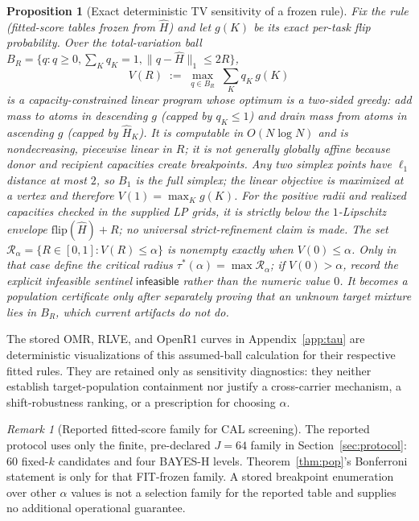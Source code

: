 \documentclass{article}
\newtheorem{proposition}{Proposition}
\theoremstyle{definition}
\theoremstyle{remark}
\newtheorem{remark}{Remark}
\newcommand{\flip}{\mathrm{flip}}
\begin{document}
\begin{proposition}[Exact deterministic TV sensitivity of a frozen rule]
\label{prop:tv}
Fix the rule (fitted-score tables frozen from $\widehat H$) and let $g(K)$ be
its exact per-task flip probability. Over the total-variation ball
$B_R=\{q:q\ge0,\sum_K q_K=1,\|q-\widehat H\|_1\le 2R\}$,
\[
V(R)\;:=\;\max_{q\in B_R}\;\textstyle\sum_K q_K\,g(K)
\]
is a capacity-constrained linear program whose optimum is a two-sided greedy:
add mass to atoms in descending $g$ (capped by $q_K\le1$) and drain mass from
atoms in ascending $g$ (capped by $\widehat H_K$). It is computable in
$O(N\log N)$ and is nondecreasing, piecewise linear in $R$; it is not
generally globally affine because donor and recipient capacities create
breakpoints. Any two simplex points have $\ell_1$ distance at most $2$, so
$B_1$ is the full simplex; the linear objective is maximized at a vertex and
therefore $V(1)=\max_K g(K)$. For the positive radii and realized capacities checked in the
supplied LP grids, it is strictly below the $1$-Lipschitz envelope
$\flip(\widehat H)+R$; no universal strict-refinement claim is made. The
set $\mathcal R_\alpha=\{R\in[0,1]:V(R)\le\alpha\}$ is nonempty exactly
when $V(0)\le\alpha$. Only in that case define the \emph{critical radius}
$\tau^*(\alpha)=\max\mathcal R_\alpha$; if $V(0)>\alpha$, record the
explicit infeasible sentinel $\mathsf{infeasible}$ rather than the numeric
value $0$. It becomes a population certificate only after separately proving
that an unknown target mixture lies in $B_R$, which current artifacts do not
do.
\end{proposition}
The stored OMR, RLVE, and OpenR1 curves in Appendix~\ref{app:tau} are
deterministic visualizations of this assumed-ball calculation for their
respective fitted rules. They are retained only as sensitivity diagnostics:
they neither establish target-population containment nor justify a
cross-carrier mechanism, a shift-robustness ranking, or a prescription for
choosing $\alpha$.

\begin{remark}[Reported fitted-score family for CAL screening]
\label{rem:nested}
The reported protocol uses only the finite, pre-declared $J=64$ family in
Section~\ref{sec:protocol}: 60 fixed-$k$ candidates and four BAYES-H levels.
Theorem~\ref{thm:pop}'s Bonferroni statement is only for that FIT-frozen
family. A stored breakpoint enumeration over other $\alpha$ values is not a
selection family for the reported table and supplies no additional operational
guarantee.
\end{remark}
\end{document}
